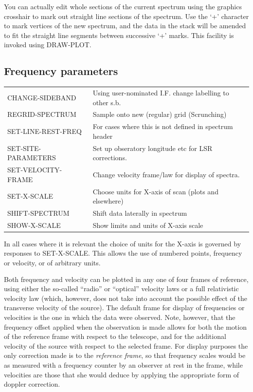 \documentclass[11pt,twoside]{report}
\begin{document}
You can actually edit whole sections of the current spectrum using the graphics crosshair to mark out straight line sections of
the spectrum. Use the `+' character to mark vertices of the new spectrum, and
the data in the stack will be amended to fit the straight line segments between
successive `+' marks\index{+}. This facility is invoked using DRAW-PLOT. 

\subsection{Frequency parameters}

\label{frames}
\begin{tabular}{ll}
CHANGE-SIDEBAND        & Using user-nominated I.F. change labelling to other s.b.\\
REGRID-SPECTRUM        & Sample onto new (regular) grid (Scrunching) \\
SET-LINE-REST-FREQ     & For cases where this is not defined in spectrum header\\
SET-SITE-PARAMETERS    & Set up obseratory longitude etc for LSR corrections.\\
SET-VELOCITY-FRAME     & Change velocity frame/law for display of spectra.\\
SET-X-SCALE            & Choose units for X-axis of scan (plots and elsewhere)\\
SHIFT-SPECTRUM         & Shift data laterally in spectrum\\
SHOW-X-SCALE            & Show limits and units of X-axis scale\\
\end{tabular}

In all cases where it is relevant the choice of units for the X-axis is
  
 governed by responses to SET-X-SCALE. This allows the
use of numbered points, frequency or velocity, or of arbitrary units. 

Both frequency and velocity can be plotted in any one of four frames of
reference, using either the so-called ``radio'' or ``optical'' velocity laws
or a full relativistic velocity law (which, however, does not take into account
the possible effect of the transverse velocity of the source). The default
frame for display of frequencies or velocities is the one in which the data
were observed. Note, however, that the frequency offset applied when the 
observation is made allows for both the motion of the reference frame with
respect to the telescope, and for the additional velocity of the source with
respect to the selected frame. For display purposes the only correction made
is to the {\em reference frame}, so that frequency scales would be as measured
with a frequency counter by an observer at rest in the frame, while velocities
are those that she would deduce by applying the appropriate form of doppler
correction. 
\end{document}
